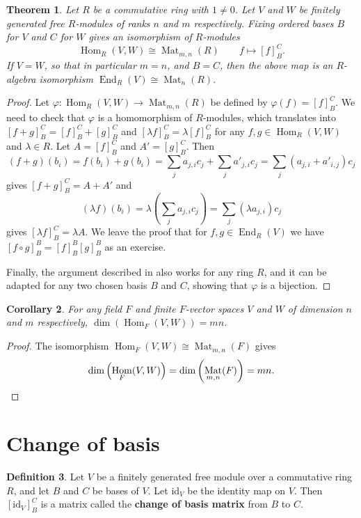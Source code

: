 \documentclass[12pt]{report}
\newtheorem{theorem}{Theorem}[chapter]
\newtheorem{corollary}[theorem]{Corollary}
\numberwithin{equation}{section}
\numberwithin{theorem}{chapter}
\theoremstyle{definition}
\newtheorem{definition}[theorem]{Definition}
\newtheorem*{basic properties}{Basic Properties}
\newtheorem*{Important Remark}{Important Remark}
\newcommand{\df}[1]{{\bf #1}\index{#1}}
\DeclareMathOperator{\End}{End}
\DeclareMathOperator{\Hom}{Hom}
\DeclareMathOperator{\M}{Mat}
\begin{document}
\begin{theorem}
\label{prop:hommat}
Let $R$ be a commutative ring with $1\neq 0$. Let $V$ and $W$ be finitely generated free $R$-modules of ranks $n$ and $m$ respectively. Fixing ordered bases $B$ for $V$ and $C$ for $W$ gives an isomorphism of $R$-modules
$$\Hom_R(V, W) \cong \M_{m,n}(R) \qquad f\mapsto [f]_B^C.$$
If $V=W$, so that in particular $m=n$, and $B=C$, then the above map is an $R$-algebra isomorphism $\End_R(V)\cong\M_n(R)$.
\end{theorem}
 
\begin{proof}
Let $\varphi\!:\Hom_R(V, W) \to \M_{m,n}(R)$ be defined by $\varphi(f)=[f]_B^C$. 
We need to check that $\varphi$ is a homomorphism of $R$-modules, which translates into $[f+g]_B^C=[f]_B^C+[g]_B^C$ and $[\lambda f]_B^C=\lambda[f]_B^C$ for any $f,g \in \Hom_R(V, W)$ and $\lambda\in R$. 
Let $A=[f]_B^C$ and $A'=[g]_B^C$. Then 
$$(f+g)(b_i)=f(b_i)+g(b_i)= \sum_j a_{j,i} c_j+ \sum_j a'_{j,i} c_j= \sum_j (a_{j,i}+a'_{i,j}) c_j$$
gives $[f+g]_B^C=A+A'$ and
$$(\lambda f)(b_i)=\lambda\left( \sum_j a_{j,i} c_j\right)= \sum_j (\lambda a_{j,i}) c_j$$
gives $[\lambda f]_B^C=\lambda A$.
We leave the proof that for $f,g\in \End_R(V)$ we have $[f\circ g]_B^B=[f]_B^B[g]_B^B$ as an exercise.

Finally, the argument described in  also works for any ring $R$, and it can be adapted for any two chosen basis $B$ and $C$, showing that $\varphi$ is a bijection.
\end{proof}



\begin{corollary}
For any field $F$ and finite $F$-vector spaces $V$ and $W$ of dimension $n$ and $m$ respectively, $\dim(\Hom_F(V, W))=mn$.
\end{corollary}

\begin{proof}
The isomorphism $\Hom_F(V, W) \cong \M_{m,n}(F)$ gives 
$$\dim \left(\Hom_F(V, W) \right) = \dim \left( \M_{m,n}(F) \right)=mn.\qedhere$$ 
\end{proof}
 



\section{Change of basis}
 

\begin{definition}
Let $V$ be a finitely generated free module over a commutative ring $R$, and let $B$ and $C$ be bases of $V$. Let $\mathrm{id}_V$ be the identity map on $V$. Then $[\mathrm{id}_V]_B^{C}$ is a matrix called the \df{change of basis matrix} from $B$ to $C$.
\end{definition}
 
\end{document}
